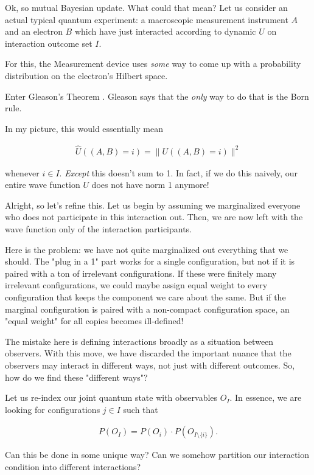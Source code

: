 \documentclass{article}
\begin{document}
Ok, so mutual Bayesian update. What could that mean? Let us consider an actual typical quantum experiment: a macroscopic measurement instrument $A$ and an electron $B$ which have just interacted according to dynamic $U$ on interaction outcome set $I$.

For this, the Measurement device uses \textit{some} way to come up with a probability distribution on the electron's Hilbert space.

Enter Gleason's Theorem \cite{Gleason1957}. Gleason says that the \textit{only} way to do that is the Born rule.

In my picture, this would essentially mean

\begin{align*}
\widehat{U}((A,B) = i) = \|U((A,B) = i)\|^2
\end{align*}

whenever $i\in I$. \textit{Except} this doesn't sum to 1. In fact, if we do this naively, our entire wave function $U$ does not have norm 1 anymore!

Alright, so let's refine this. Let us begin by assuming we marginalized everyone who does not participate in this interaction out. Then, we are now left with the wave function only of the interaction participants.

Here is the problem: we have not quite marginalized out everything that we should. The "plug in a 1" part works for a single configuration, but not if it is paired with a ton of irrelevant configurations. If these were finitely many irrelevant configurations, we could maybe assign equal weight to every configuration that keeps the component we care about the same. But if the marginal configuration is paired with a non-compact configuration space, an "equal weight" for all copies becomes ill-defined! 

The mistake here is defining interactions broadly as a situation between observers. With this move, we have discarded the important nuance that the observers may interact in different ways, not just with different outcomes. So, how do we find these "different ways"?

Let us re-index our joint quantum state with observables $O_I$. In essence, we are looking for configurations $j\in I$ such that

\begin{align*}
P(O_I) = P(O_i) \cdot P(O_{I\setminus\lbrace i\rbrace}).
\end{align*}

Can this be done in some unique way? Can we somehow partition our interaction condition into different interactions?
\end{document}
